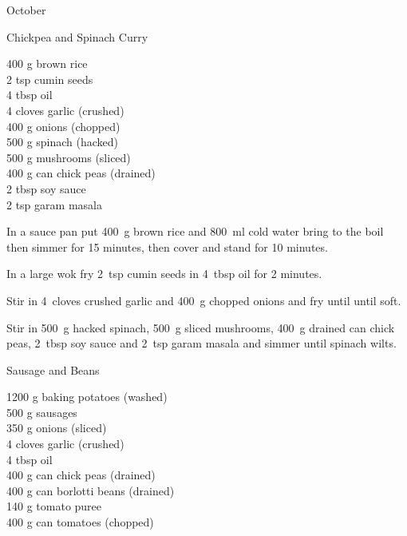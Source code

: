 \begin{menu}{October}
    \begin{recipe}{2}{Chickpea and Spinach Curry}%
		\begin{ingredients}
		400 g brown rice  \\
	2 tsp cumin seeds  \\
	4 tbsp oil  \\
	4 cloves garlic (crushed) \\
	400 g onions (chopped) \\
	500 g spinach (hacked) \\
	500 g mushrooms (sliced) \\
	400 g can chick peas (drained) \\
	2 tbsp soy sauce  \\
	2 tsp garam masala  \\
	
		\end{ingredients}
	
	
    \begin{instructions}
    \item 
      In a
      sauce pan
      put
      400~g  brown rice
      and
      800~ml  cold water
      bring to the boil then simmer for 15 minutes,
      then cover and stand for 10 minutes.
    \item 
        In a large wok fry
        2~tsp  cumin seeds
        in
        4~tbsp  oil
        for 2 minutes.
      \item 
        Stir in
        4~cloves crushed garlic
        and
        400~g chopped onions
        and fry until until soft.
      \item 
        Stir in
        500~g hacked spinach,
        500~g sliced mushrooms,
        400~g drained can chick peas,
        2~tbsp  soy sauce
        and
        2~tsp  garam masala
        and simmer until spinach wilts.
      
    \end{instructions}
    \end{recipe}%
  
    \begin{recipe}{2}{Sausage and Beans}%
		\begin{ingredients}
		1200 g baking potatoes (washed) \\
	500 g sausages  \\
	350 g onions (sliced) \\
	4 cloves garlic (crushed) \\
	4 tbsp oil  \\
	400 g can chick peas (drained) \\
	400 g can borlotti beans (drained) \\
	140 g tomato puree  \\
	400 g can tomatoes (chopped) \\
	

\end{ingredients}
\end{recipe}
\end{menu}
